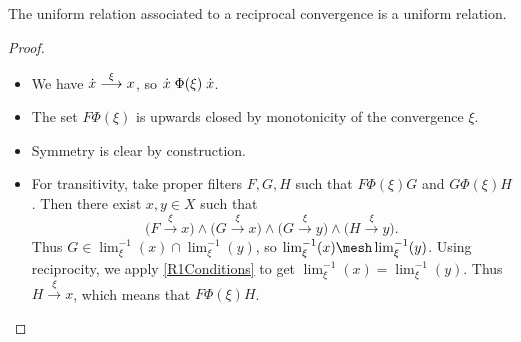 \begin{lemma} \label{uniformRelationAssociatedToR1Convergence}
The uniform relation associated to a reciprocal convergence is a uniform relation.
\end{lemma}
\begin{proof}
\begin{itemize}
\item We have $\dot{x}\overset{\xi}{\longrightarrow} x$, so $\dot{x}\mathrel{\Phi(\xi)}\dot{x}$.
\item The set $F\mathrel{\Phi(\xi)}$ is upwards closed by monotonicity of the convergence $\xi$.
\item Symmetry is clear by construction.
\item For transitivity, take proper filters $F,G,H$ such that $F\mathrel{\Phi(\xi)}G$ and $G\mathrel{\Phi(\xi)}H$. Then there exist $x,y\in X$ such that
\[ \big(F\overset{\xi}{\longrightarrow} x\big) \land \big(G\overset{\xi}{\longrightarrow} x\big) \land \big(G\overset{\xi}{\longrightarrow} y\big) \land \big(H\overset{\xi}{\longrightarrow} y\big). \]
Thus $G\in \lim^{-1}_\xi(x) \cap\lim^{-1}_\xi(y)$, so $\lim^{-1}_\xi(x) \mesh\lim^{-1}_\xi(y)$. Using reciprocity, we apply \ref{R1Conditions} to get $\lim^{-1}_\xi(x) = \lim^{-1}_\xi(y)$. Thus $H \overset{\xi}{\longrightarrow} x$, which means that $F\mathrel{\Phi(\xi)}H$.
\end{itemize}
\end{proof}

